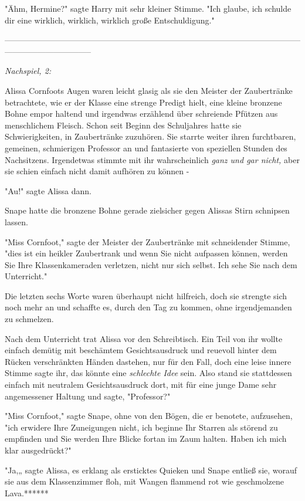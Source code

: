 {"Ähm, Hermine?" sagte Harry mit sehr kleiner Stimme. "Ich glaube, ich schulde dir eine wirklich, wirklich, wirklich große Entschuldigung."

--------------------------------------------------------------------------------------------------------------------------------------------

\emph{Nachspiel, 2:}

Alissa Cornfoots Augen waren leicht glasig als sie den Meister der Zaubertränke betrachtete, wie er der Klasse eine strenge Predigt hielt, eine kleine bronzene Bohne empor haltend und irgendwas erzählend über schreiende Pfützen aus menschlichem Fleisch. Schon seit Beginn des Schuljahres hatte sie Schwierigkeiten, in Zaubertränke zuzuhören. Sie starrte weiter ihren furchtbaren, gemeinen, schmierigen Professor an und fantasierte von speziellen Stunden des Nachsitzens. Irgendetwas stimmte mit ihr wahrscheinlich \emph{ganz und gar nicht,} aber sie schien einfach nicht damit aufhören zu können -

"Au!" sagte Alissa dann.

Snape hatte die bronzene Bohne gerade zielsicher gegen Alissas Stirn schnipsen lassen.

"Miss Cornfoot," sagte der Meister der Zaubertränke mit schneidender Stimme, "dies ist ein heikler Zaubertrank und wenn Sie nicht aufpassen können, werden Sie Ihre Klassenkameraden verletzen, nicht nur sich selbst. Ich sehe Sie nach dem Unterricht."

Die letzten sechs Worte waren überhaupt nicht hilfreich, doch sie strengte sich noch mehr an und schaffte es, durch den Tag zu kommen, ohne irgendjemanden zu schmelzen.

Nach dem Unterricht trat Alissa vor den Schreibtisch. Ein Teil von ihr wollte einfach demütig mit beschämtem Gesichtsausdruck und reuevoll hinter dem Rücken verschränkten Händen dastehen, nur für den Fall, doch eine leise innere Stimme sagte ihr, das könnte eine \emph{schlechte Idee} sein. Also stand sie stattdessen einfach mit neutralem Gesichtsausdruck dort, mit für eine junge Dame sehr angemessener Haltung und sagte, "Professor?"

"Miss Cornfoot," sagte Snape, ohne von den Bögen, die er benotete, aufzusehen, "ich erwidere Ihre Zuneigungen nicht, ich beginne Ihr Starren als störend zu empfinden und Sie werden Ihre Blicke fortan im Zaum halten. Haben ich mich klar ausgedrückt?"

"Ja,„ sagte Alissa, es erklang als ersticktes Quieken und Snape entließ sie, worauf sie aus dem Klassenzimmer floh, mit Wangen flammend rot wie geschmolzene Lava.******

}

